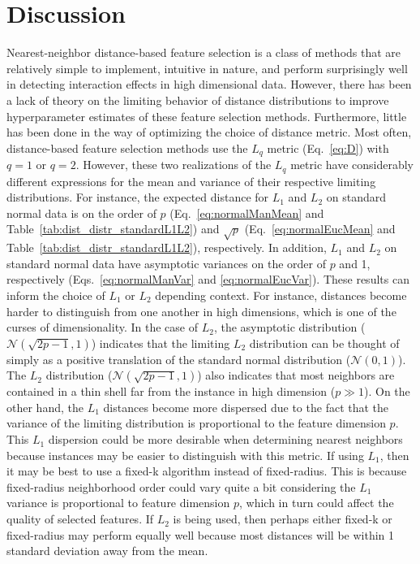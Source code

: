 \documentclass[aoas]{imsart}
\begin{document}
\section{Discussion}\label{sec:discussion}

Nearest-neighbor distance-based feature selection is a class of methods that are relatively simple to implement, intuitive in nature, and perform surprisingly well in detecting interaction effects in high dimensional data. However, there has been a lack of theory on the limiting behavior of distance distributions to improve hyperparameter estimates of these feature selection methods. Furthermore, little has been done in the way of optimizing the choice of distance metric. Most often, distance-based feature selection methods use the $L_q$ metric (Eq.~\ref{eq:D}) with $q=1$ or $q=2$. However, these two realizations of the $L_q$ metric have considerably different expressions for the mean and variance of their respective limiting distributions. For instance, the expected distance for $L_1$ and $L_2$ on standard normal data is on the order of $p$ (Eq.~\ref{eq:normalManMean} and Table~\ref{tab:dist_distr_standardL1L2}) and $\sqrt{p}$ (Eq.~\ref{eq:normalEucMean} and Table~\ref{tab:dist_distr_standardL1L2}), respectively. In addition, $L_1$ and $L_2$ on standard normal data have asymptotic variances on the order of $p$ and 1, respectively (Eqs.~\ref{eq:normalManVar} and \ref{eq:normalEucVar}). These results can inform the choice of $L_1$ or $L_2$ depending context. For instance, distances become harder to distinguish from one another in high dimensions, which is one of the curses of dimensionality. In the case of $L_2$, the asymptotic distribution ($\mathcal{N}(\sqrt{2p - 1},1)$) indicates that the limiting $L_2$ distribution can be thought of simply as a positive translation of the standard normal distribution ($\mathcal{N}(0,1)$). The $L_2$ distribution ($\mathcal{N}(\sqrt{2p - 1},1)$) also indicates that most neighbors are contained in a thin shell far from the instance in high dimension ($p \gg 1$). On the other hand, the $L_1$ distances become more dispersed due to the fact that the variance of the limiting distribution is proportional to the feature dimension $p$. This $L_1$ dispersion could be more desirable when determining nearest neighbors because instances may be easier to distinguish with this metric. If using $L_1$, then it may be best to use a fixed-k algorithm instead of fixed-radius. This is because fixed-radius neighborhood order could vary quite a bit considering the $L_1$ variance is proportional to feature dimension $p$, which in turn could affect the quality of selected features. If $L_2$ is being used, then perhaps either fixed-k or fixed-radius may perform equally well because most distances will be within 1 standard deviation away from the mean. 
\end{document}
